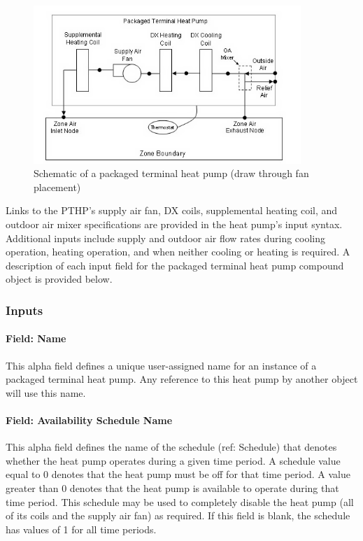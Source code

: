 \begin{figure}[hbtp] %
\centering
\includegraphics[width=0.9\textwidth, height=0.9\textheight, keepaspectratio=true]{media/image285.png}
\caption{Schematic of a packaged terminal heat pump (draw through fan placement) \protect \label{fig:schematic-of-a-packaged-terminal-heat-pump-001}}
\end{figure}

Links to the PTHP's supply air fan, DX coils, supplemental heating coil, and outdoor air mixer specifications are provided in the heat pump's input syntax. Additional inputs include supply and outdoor air flow rates during cooling operation, heating operation, and when neither cooling or heating is required. A description of each input field for the packaged terminal heat pump compound object is provided below.

\subsubsection{Inputs}\label{inputs-9-026}

\paragraph{Field: Name}\label{field-name-9-022}

This alpha field defines a unique user-assigned name for an instance of a packaged terminal heat pump. Any reference to this heat pump by another object will use this name.

\paragraph{Field: Availability Schedule Name}\label{field-availability-schedule-name-8-005}

This alpha field defines the name of the schedule (ref: Schedule) that denotes whether the heat pump operates during a given time period. A schedule value equal to 0 denotes that the heat pump must be off for that time period. A value greater than 0 denotes that the heat pump is available to operate during that time period. This schedule may be used to completely disable the heat pump (all of its coils and the supply air fan) as required. If this field is blank, the schedule has values of 1 for all time periods.

